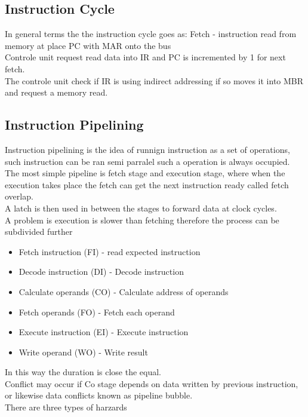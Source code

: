\documentclass[12pt, a4paper]{article}
\begin{document}
		\subsection{Instruction Cycle}
			In general terms the the instruction cycle goes as:
			Fetch - instruction read from memory at place PC with MAR onto the bus\\
			Controle unit request read data into IR and PC is incremented by 1 for next fetch.\\
			The controle unit check if IR is using indirect addressing if so moves it into MBR and request a memory read.\\
		\subsection{Instruction Pipelining}
			Instruction pipelining is the idea of runnign instruction as a set of operations, such instruction can be ran semi parralel such a operation is always occupied.\\
			The most simple pipeline is fetch stage and execution stage, where when the execution takes place the fetch can get the next instruction ready called fetch overlap.\\
			A latch is then used in between the stages to forward data at clock cycles.\\
			A problem is execution is slower than fetching therefore the process can be subdivided further
			\begin{itemize}
				\item Fetch instruction (FI) - read expected instruction
				\item Decode instruction (DI) - Decode instruction
				\item Calculate operands (CO) - Calculate address of operands
				\item Fetch operands (FO) - Fetch each operand
				\item Execute instruction (EI) - Execute instruction
				\item Write operand (WO) - Write result
			\end{itemize}
			In this way the duration is close the equal.\\
			Conflict may occur if Co stage depends on data written by previous instruction, or likewise data conflicts known as pipeline bubble.\\
			There are three types of harzards
\end{document}
